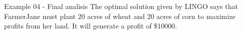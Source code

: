\begin{frame}{Example 04 - Final analisis}
The optimal solution given by LINGO says that FarmerJane must plant  20 acres of wheat  and
20 acres of corn to maximize profits from her land. It will generate a profit of \$10000.
\end{frame}
